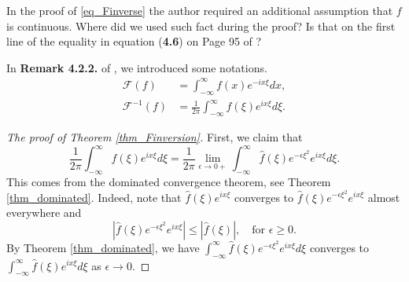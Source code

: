 \begin{Question}
In the proof of \ref{eq_Finverse} the author required an additional assumption that $f$ is continuous. 
Where did we used such fact during the proof? 
Is that on the first line of the equality in equation (\textbf{4.6}) on Page 95 of \cite{epstein2007introduction}?
\end{Question}
In \textbf{Remark 4.2.2.} of \cite{epstein2007introduction}, we introduced some notations. 
\begin{align*}
    \mathscr F (f)&=\int_{-\infty}^{\infty} f(x)e^{-ix\xi}dx,\\
    \mathscr F^{-1} (f)&= \frac{1}{2\pi}\int_{-\infty}^{\infty}f(\xi)e^{ix\xi}d\xi.
\end{align*}

\begin{proof}[The proof of Theorem \ref{thm_Finversion}]
First, we claim that 
\[
\frac{1}{2\pi} \int_{-\infty}^{\infty} \hat{f}(\xi) e^{i x \xi } d \xi 
=  \frac{1}{2\pi} \lim_{\epsilon \rightarrow 0+} \int_{-\infty}^{\infty} \hat{f}(\xi) e^{-\epsilon \xi^2} e^{i x \xi } d \xi. 
\]
This comes from the dominated convergence theorem, see Theorem \ref{thm_dominated}. 
Indeed, note that $\hat{f}(\xi) e^{i x \xi }$ converges to $\hat{f}(\xi) e^{-\epsilon \xi^2} e^{i x \xi }$ almost everywhere and 
\[
|\hat{f}(\xi) e^{-\epsilon \xi^2} e^{i x \xi }| \leq |\hat{f}(\xi)|, \quad \text{for } \epsilon \geq 0.
\]
By Theorem \ref{thm_dominated}, we have $\int_{-\infty}^{\infty} \hat{f}(\xi) e^{-\epsilon \xi^2} e^{i x \xi } d \xi$ converges to $\int_{-\infty}^{\infty} \hat{f}(\xi) e^{i x \xi } d \xi$ as $\epsilon \rightarrow 0$.


\end{proof}
